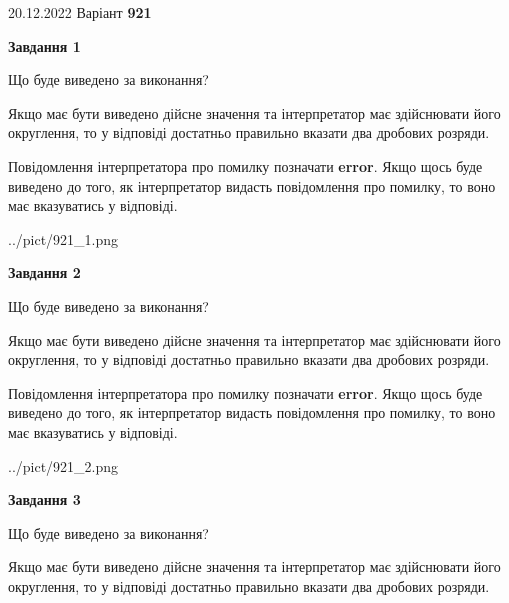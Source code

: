 \documentclass[12pt, ukrainian]{article}
\begin{document}
{20.12.2022 Варіант \No \textbf { 921 }\par}
{
\begin {Large}

{\begin {center}\textbf{Завдання 1}\end {center}}\par
Що буде виведено за виконання? \par

Якщо має бути виведено дійсне значення та інтерпретатор має здійснювати його округлення, 
то у відповіді достатньо правильно вказати два дробових розряди.

Повідомлення інтерпретатора про помилку позначати \textbf{error}.
Якщо щось буде виведено до того, як інтерпретатор видасть повідомлення про помилку, 
то воно має вказуватись у відповіді. \par

\begin{center}
	{../pict/921_1.png}
\end{center}
\newpage

{\begin {center}\textbf{Завдання 2}\end {center}}\par
Що буде виведено за виконання? \par

Якщо має бути виведено дійсне значення та інтерпретатор має здійснювати його округлення, 
то у відповіді достатньо правильно вказати два дробових розряди.

Повідомлення інтерпретатора про помилку позначати \textbf{error}.
Якщо щось буде виведено до того, як інтерпретатор видасть повідомлення про помилку, 
то воно має вказуватись у відповіді. \par

\begin{center}
	{../pict/921_2.png}
\end{center}
\newpage

{\begin {center}\textbf{Завдання 3}\end {center}}\par
Що буде виведено за виконання? \par

Якщо має бути виведено дійсне значення та інтерпретатор має здійснювати його округлення, 
то у відповіді достатньо правильно вказати два дробових розряди.


\end{Large}}
\end{document}
